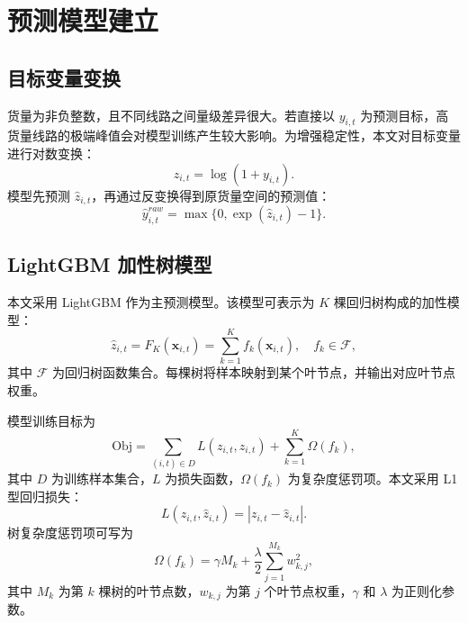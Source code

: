 \documentclass[UTF8,zihao=-4,a4paper,fontset=fandol]{ctexart}
\begin{document}
\section{预测模型建立}

\subsection{目标变量变换}

货量为非负整数，且不同线路之间量级差异很大。若直接以 $y_{i,t}$ 为预测目标，高货量线路的极端峰值会对模型训练产生较大影响。为增强稳定性，本文对目标变量进行对数变换：
\begin{equation}
  z_{i,t}=\log(1+y_{i,t}).
  \label{eq:log-target}
\end{equation}
模型先预测 $\hat z_{i,t}$，再通过反变换得到原货量空间的预测值：
\begin{equation}
  \hat y_{i,t}^{raw}=\max\{0,\exp(\hat z_{i,t})-1\}.
  \label{eq:inverse}
\end{equation}

\subsection{LightGBM 加性树模型}

本文采用 LightGBM 作为主预测模型。该模型可表示为 $K$ 棵回归树构成的加性模型：
\begin{equation}
  \hat z_{i,t}=F_K(\boldsymbol{x}_{i,t})
  =\sum_{k=1}^{K}f_k(\boldsymbol{x}_{i,t}),\quad f_k\in\mathcal{F},
  \label{eq:lgb-additive}
\end{equation}
其中 $\mathcal{F}$ 为回归树函数集合。每棵树将样本映射到某个叶节点，并输出对应叶节点权重。

模型训练目标为
\begin{equation}
  \mathrm{Obj}=
  \sum_{(i,t)\in D}L(z_{i,t},\hat z_{i,t})
  +\sum_{k=1}^{K}\Omega(f_k),
  \label{eq:objective}
\end{equation}
其中 $D$ 为训练样本集合，$L$ 为损失函数，$\Omega(f_k)$ 为复杂度惩罚项。本文采用 L1 型回归损失：
\begin{equation}
  L(z_{i,t},\hat z_{i,t})=|z_{i,t}-\hat z_{i,t}|.
  \label{eq:l1-loss}
\end{equation}
树复杂度惩罚项可写为
\begin{equation}
  \Omega(f_k)=\gamma M_k+\frac{\lambda}{2}\sum_{j=1}^{M_k}w_{k,j}^2,
  \label{eq:regularization}
\end{equation}
其中 $M_k$ 为第 $k$ 棵树的叶节点数，$w_{k,j}$ 为第 $j$ 个叶节点权重，$\gamma$ 和 $\lambda$ 为正则化参数。
\end{document}
